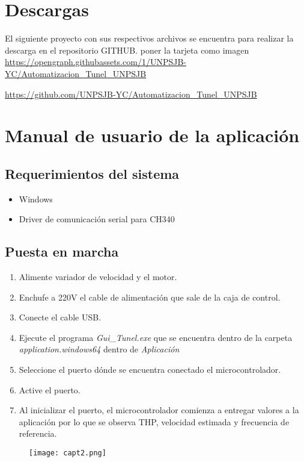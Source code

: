 \section{Descargas}
El siguiente proyecto con sus respectivos archivos se encuentra para realizar la descarga en el repositorio GITHUB.
poner la tarjeta como imagen
\url{https://opengraph.githubassets.com/1/UNPSJB-YC/Automatizacion_Tunel_UNPSJB}

\url{https://github.com/UNPSJB-YC/Automatizacion_Tunel_UNPSJB}
\newpage
\section{Manual de usuario de la aplicación}
\subsection{Requerimientos del sistema}
\begin{itemize}
	\item Windows
	\item Driver de comunicación serial para CH340 
\end{itemize}


\subsection{Puesta en marcha}
\begin{enumerate}
	\item Alimente variador de velocidad y el motor.
	\item Enchufe a 220V el cable de alimentación que sale de la caja de control.
	\item Conecte el cable USB.
	\item Ejecute el programa \textit{Gui\_Tunel.exe} que se encuentra dentro de la carpeta \textit{application.windows64} dentro de \textit{Aplicación}
	\item Seleccione el puerto dónde se encuentra conectado el microcontrolador.
	\item Active el puerto.
	\item Al inicializar el puerto, el microcontrolador comienza a entregar valores a la aplicación por lo que se observa THP, velocidad estimada y frecuencia de referencia. 
	
\end{enumerate}

\begin{figure}[H]
	\centering
	\texttt{[image: capt2.png]}
	\label{fig:capt2}
\end{figure}



